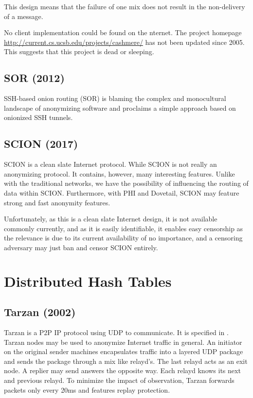 This design means that the failure of one mix does not result in the non-delivery of a message.

No client implementation could be found on the \textit{}nternet. The project homepage \href{http://current.cs.ucsb.edu/projects/cashmere/}{http://current.cs.ucsb.edu/projects/cashmere/} has not been updated since 2005. This suggests that this project is dead or sleeping.

\subsection{SOR (2012)}
SSH-based onion routing (SOR)\cite{Egners_2012} is blaming the complex and monocultural landscape of anonymizing software and proclaims a simple approach based on onionized SSH tunnels. 

\subsection{SCION (2017)}
SCION\cite{perrig2017scion} is a clean slate Internet protocol. While SCION is not really an anonymizing protocol. It contains, however,  many interesting features. Unlike with the traditional networks, we have the possibility of influencing the routing of data within SCION. Furthermore, with PHI\cite{chen2017phi} and Dovetail\cite{sankey2014dovetail}, SCION may feature strong and fast anonymity features. 

Unfortunately, as this is a clean slate Internet design, it is not available commonly currently, and as it is easily identifiable, it enables easy censorship as the relevance is due to its current availability of no importance, and a censoring adversary may just ban and censor SCION entirely. 

\section{Distributed Hash Tables}
\subsection{Tarzan (2002)}
Tarzan is a P2P IP protocol using UDP to communicate. It is specified in \cite{tarzan:ccs02}. Tarzan nodes may be used to anonymize Internet traffic in general. An initiator on the original sender machines encapsulates traffic into a layered UDP package and sends the package through a mix like relayd's. The last relayd acts as an exit node. A replier may send answers the opposite way. Each relayd knows its next and previous relayd. To minimize the impact of observation, Tarzan forwards packets only every 20ms and features replay protection.

